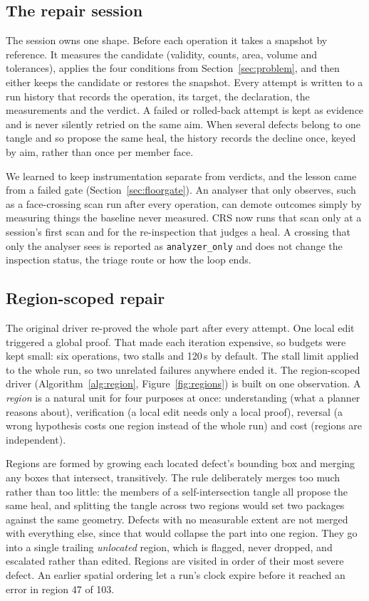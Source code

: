 \documentclass[11pt,onecolumn]{article}
\newcommand{\code}[1]{\texttt{\small #1}}
\begin{document}
\subsection{The repair session}\label{sec:session}
The session owns one shape. Before each operation it takes a snapshot by reference. It measures the
candidate (validity, counts, area, volume and tolerances), applies the four conditions from
Section~\ref{sec:problem}, and then either keeps the candidate or restores the snapshot. Every
attempt is written to a run history that records the operation, its target, the declaration, the
measurements and the verdict. A failed or rolled-back attempt is kept as evidence and is never
silently retried on the same aim. When several defects belong to one tangle and so propose the same
heal, the history records the decline once, keyed by aim, rather than once per member face.

We learned to keep instrumentation separate from verdicts, and the lesson came from a failed gate
(Section~\ref{sec:floorgate}). An analyser that only observes, such as a face-crossing scan run
after every operation, can demote outcomes simply by measuring things the baseline never measured.
CRS now runs that scan only at a session's first scan and for the re-inspection that judges a heal.
A crossing that only the analyser sees is reported as \code{analyzer\_only} and does not change the
inspection status, the triage route or how the loop ends.

\subsection{Region-scoped repair}\label{sec:regions}
The original driver re-proved the whole part after every attempt. One local edit triggered a global
proof. That made each iteration expensive, so budgets were kept small: six operations, two stalls
and 120\,s by default. The stall limit applied to the whole run, so two unrelated failures anywhere
ended it. The region-scoped driver (Algorithm~\ref{alg:region}, Figure~\ref{fig:regions}) is built
on one observation. A \emph{region} is a natural unit for four purposes at once: understanding (what
a planner reasons about), verification (a local edit needs only a local proof), reversal (a wrong
hypothesis costs one region instead of the whole run) and cost (regions are independent).

Regions are formed by growing each located defect's bounding box and merging any boxes that
intersect, transitively. The rule deliberately merges too much rather than too little: the members
of a self-intersection tangle all propose the same heal, and splitting the tangle across two regions
would set two packages against the same geometry. Defects with no measurable extent are not merged
with everything else, since that would collapse the part into one region. They go into a single
trailing \emph{unlocated} region, which is flagged, never dropped, and escalated rather than edited.
Regions are visited in order of their most severe defect. An earlier spatial ordering let a run's
clock expire before it reached an error in region 47 of 103.
\end{document}
